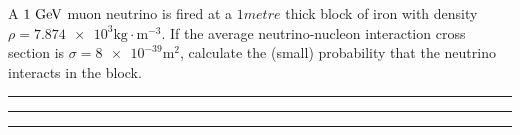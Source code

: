 \begin{problem}{3.6}
A $1\text{ GeV}$ muon neutrino is fired at a $1\unit{metre}$ thick block of iron with density $\rho=\num{7.874e3}\unit{\kilo\gram\cdot\metre^{-3}}$.
If the average neutrino-nucleon interaction cross section is $\sigma=\num{8e-39}\unit{\square\metre}$, calculate the (small) probability that the neutrino interacts in the block.
\end{problem}
            
\begin{solution}
        
            
\end{solution} 
    
\noindent\rule{7in}{1.5pt}
    


\begin{problem}{3.7}

\end{problem}
            
\begin{solution}
        
            
\end{solution} 
    
\noindent\rule{7in}{1.5pt}
    


\begin{problem}{3.8}

\end{problem}
            
\begin{solution}
        
            
\end{solution} 
    
\noindent\rule{7in}{1.5pt}
    
